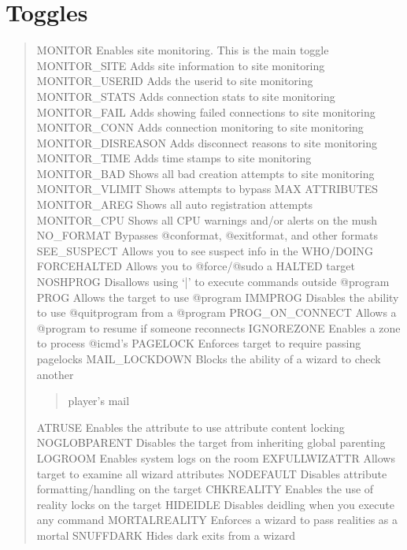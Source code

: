 \documentclass[letterpaper,10pt,english]{sphinxmanual}
\begin{document}
\section{Toggles}
\label{\detokenize{08-lockdown:toggles}}\begin{quote}

\sphinxAtStartPar
MONITOR            \sphinxhyphen{} Enables site monitoring.  This is the main toggle
MONITOR\_SITE       \sphinxhyphen{} Adds site information to site monitoring
MONITOR\_USERID     \sphinxhyphen{} Adds the userid to site monitoring
MONITOR\_STATS      \sphinxhyphen{} Adds connection stats to site monitoring
MONITOR\_FAIL       \sphinxhyphen{} Adds showing failed connections to site monitoring
MONITOR\_CONN       \sphinxhyphen{} Adds connection monitoring to site monitoring
MONITOR\_DISREASON  \sphinxhyphen{} Adds disconnect reasons to site monitoring
MONITOR\_TIME       \sphinxhyphen{} Adds time stamps to site monitoring
MONITOR\_BAD        \sphinxhyphen{} Shows all bad creation attempts to site monitoring
MONITOR\_VLIMIT     \sphinxhyphen{} Shows attempts to bypass MAX ATTRIBUTES
MONITOR\_AREG       \sphinxhyphen{} Shows all auto registration attempts
MONITOR\_CPU        \sphinxhyphen{} Shows all CPU warnings and/or alerts on the mush
NO\_FORMAT          \sphinxhyphen{} Bypasses @conformat, @exitformat, and other formats
SEE\_SUSPECT        \sphinxhyphen{} Allows you to see suspect info in the WHO/DOING
FORCEHALTED        \sphinxhyphen{} Allows you to @force/@sudo a HALTED target
NOSHPROG           \sphinxhyphen{} Disallows using ‘|’ to execute commands outside @program
PROG               \sphinxhyphen{} Allows the target to use @program
IMMPROG            \sphinxhyphen{} Disables the ability to use @quitprogram from a @program
PROG\_ON\_CONNECT    \sphinxhyphen{} Allows a @program to resume if someone reconnects
IGNOREZONE         \sphinxhyphen{} Enables a zone to process @icmd’s
PAGELOCK           \sphinxhyphen{} Enforces target to require passing pagelocks
MAIL\_LOCKDOWN      \sphinxhyphen{} Blocks the ability of a wizard to check another
\begin{quote}

\sphinxAtStartPar
player’s mail
\end{quote}

\sphinxAtStartPar
ATRUSE             \sphinxhyphen{} Enables the attribute to use attribute content locking
NOGLOBPARENT       \sphinxhyphen{} Disables the target from inheriting global parenting
LOGROOM            \sphinxhyphen{} Enables system logs on the room
EXFULLWIZATTR      \sphinxhyphen{} Allows target to examine all wizard attributes
NODEFAULT          \sphinxhyphen{} Disables attribute formatting/handling on the target
CHKREALITY         \sphinxhyphen{} Enables the use of reality locks on the target
HIDEIDLE           \sphinxhyphen{} Disables deidling when you execute any command
MORTALREALITY      \sphinxhyphen{} Enforces a wizard to pass realities as a mortal
SNUFFDARK          \sphinxhyphen{} Hides dark exits from a wizard
\end{quote}
\end{document}
